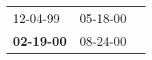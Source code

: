 \begin{supertabular}{p{0.33\columnwidth}p{0.33\columnwidth}p{0.33\columnwidth}}
          12-04-99\textsuperscript{} &  05-18-00\textsuperscript{} \\
 \textbf{02-19-00\textsuperscript{}} &  08-24-00\textsuperscript{} \\
\end{supertabular}
